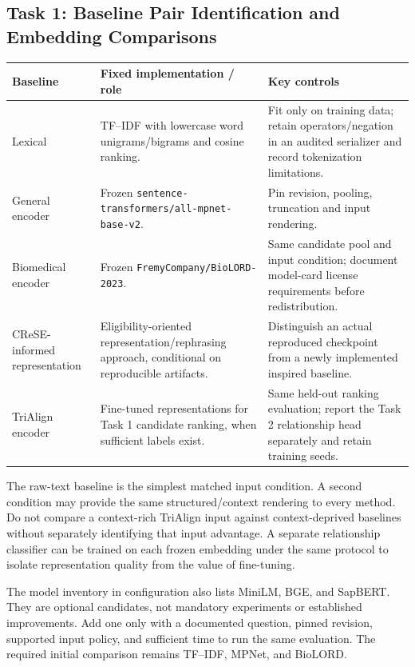 \documentclass[10pt,letterpaper]{article}
\newcommand{\pathcode}[1]{\nolinkurl{#1}}
\begin{document}
\subsection{Task 1: Baseline Pair Identification and Embedding Comparisons}
\label{sec:baselines}
\begin{longtable}{L{.22\linewidth}L{.37\linewidth}L{.32\linewidth}}
\toprule Baseline & Fixed implementation / role & Key controls\\\midrule
\endhead
Lexical & TF--IDF with lowercase word unigrams/bigrams and cosine ranking. & Fit only on training data; retain operators/negation in an audited serializer and record tokenization limitations.\\
General encoder & Frozen \pathcode{sentence-transformers/all-mpnet-base-v2}. & Pin revision, pooling, truncation and input rendering.\\
Biomedical encoder & Frozen \pathcode{FremyCompany/BioLORD-2023}. & Same candidate pool and input condition; document model-card license requirements before redistribution.\\
CReSE-informed representation & Eligibility-oriented representation/rephrasing approach, conditional on reproducible artifacts. & Distinguish an actual reproduced checkpoint from a newly implemented inspired baseline.\\
TriAlign encoder & Fine-tuned representations for Task 1 candidate ranking, when sufficient labels exist. & Same held-out ranking evaluation; report the Task 2 relationship head separately and retain training seeds.\\\bottomrule
\end{longtable}

The raw-text baseline is the simplest matched input condition. A second
condition may provide the same structured/context rendering to every method.
Do not compare a context-rich TriAlign input against context-deprived baselines
without separately identifying that input advantage. A separate relationship
classifier can be trained on each frozen embedding under the same protocol
to isolate representation quality from the value of fine-tuning.

The model inventory in configuration also lists MiniLM, BGE, and SapBERT.
They are optional candidates, not mandatory experiments or established
improvements. Add one only with a documented question, pinned revision,
supported input policy, and sufficient time to run the same evaluation.
The required initial comparison remains TF--IDF, MPNet, and BioLORD.
\end{document}
